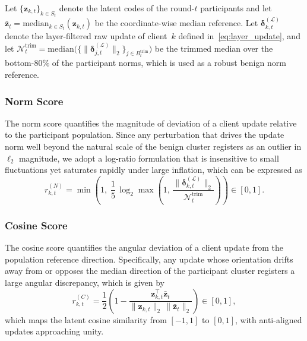 \documentclass[journal]{IEEEtran}
\begin{document}
Let $\{\mathbf{z}_{k,t}\}_{k\in S_t}$ denote the latent codes of the round-$t$ participants and let $\bar{\mathbf{z}}_t = \mathrm{median}_{k \in S_t}(\mathbf{z}_{k,t})$ be the coordinate-wise median reference. Let $\boldsymbol{\delta}_{k,t}^{(\mathcal{L})}$ denote the layer-filtered raw update of client~$k$ defined in~\eqref{eq:layer_update}, and let $\mathcal{N}_t^{\mathrm{trim}} = \mathrm{median}\bigl(\bigl\{\|\boldsymbol{\delta}_{j,t}^{(\mathcal{L})}\|_2\bigr\}_{j \in B_t^{\mathrm{trim}}}\bigr)$ be the trimmed median over the bottom-$80\%$ of the participant norms, which is used as a robust benign norm reference.

\subsubsection{Norm Score}
The norm score quantifies the magnitude of deviation of a client update relative to the participant population. Since any perturbation that drives the update norm well beyond the natural scale of the benign cluster registers as an outlier in $\ell_2$ magnitude, we adopt a log-ratio formulation that is insensitive to small fluctuations yet saturates rapidly under large inflation, which can be expressed as
\begin{equation}
r_{k,t}^{(N)} = \min\!\left(1,\; \frac{1}{5}\,\log_2\max\!\left(1,\, \frac{\|\boldsymbol{\delta}_{k,t}^{(\mathcal{L})}\|_2}{\mathcal{N}_t^{\mathrm{trim}}}\right)\right) \in [0,1].
\label{eq:norm_score}
\end{equation}

\subsubsection{Cosine Score}
The cosine score quantifies the angular deviation of a client update from the population reference direction. Specifically, any update whose orientation drifts away from or opposes the median direction of the participant cluster registers a large angular discrepancy, which is given by
\begin{equation}
r_{k,t}^{(C)} = \frac{1}{2}\!\left(1 - \frac{\mathbf{z}_{k,t}^{\!\top} \bar{\mathbf{z}}_t}{\|\mathbf{z}_{k,t}\|_2 \, \|\bar{\mathbf{z}}_t\|_2}\right) \in [0,1],
\label{eq:cos_score}
\end{equation}
which maps the latent cosine similarity from $[-1,1]$ to $[0,1]$, with anti-aligned updates approaching unity.
\end{document}
